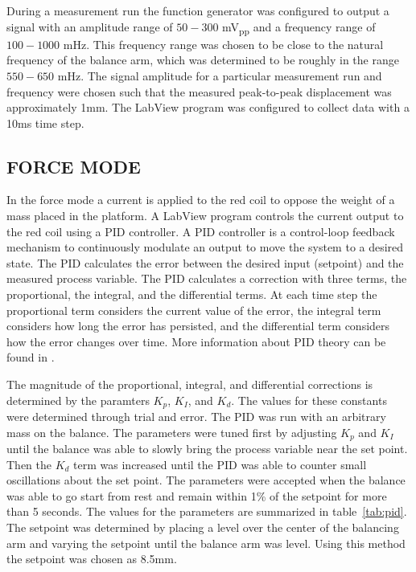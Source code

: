 \documentclass[aps,prstab,reprint,12pt]{revtex4-1}
\begin{document}
During a measurement run the function generator was configured to output a signal with an amplitude range of $50-300$ \si{mV_{pp}} and a frequency range of $100-1000$ \si{mHz}. This frequency range was chosen to be close to the natural frequency of the balance arm, which was determined to be roughly in the range $550-650$ \si{mHz}. The signal amplitude for a particular measurement run and frequency were chosen such that the measured peak-to-peak displacement was approximately 1\si{mm}. The LabView program was configured to collect data with a 10ms time step.

\newpage\subsection{FORCE MODE}

In the force mode a current is applied to the red coil to oppose the weight of a mass placed in the platform. A LabView program controls the current output to the red coil using a PID controller. A PID controller is a control-loop feedback mechanism to continuously modulate an output to move the system to a desired state.
The PID calculates the error between the desired input (setpoint) and the measured process variable.
The PID calculates a correction with three terms, the proportional, the integral, and the differential terms. At each time step the proportional term considers the current value of the error, the integral term considers how long the error has persisted, and the differential term considers how the error changes over time.
More information about PID theory can be found in \cite{pid}.

The magnitude of the proportional, integral, and differential corrections is determined by the paramters $K_p$, $K_I$, and $K_d$. The values for these constants were determined through trial and error. The PID was run with an arbitrary mass on the balance.
The parameters were tuned first by adjusting $K_p$ and $K_I$ until the balance was able to slowly bring the process variable near the set point.
Then the $K_d$ term was increased until the PID was able to counter small oscillations about the set point. The parameters were accepted when the balance was able to go start from rest and remain within 1\% of the setpoint for more than 5 seconds. The values for the parameters are summarized in table~\ref{tab:pid}. The setpoint was determined by placing a level over the center of the balancing arm and varying the setpoint until the balance arm was level. Using this method the setpoint was chosen as 8.5mm.
\end{document}
